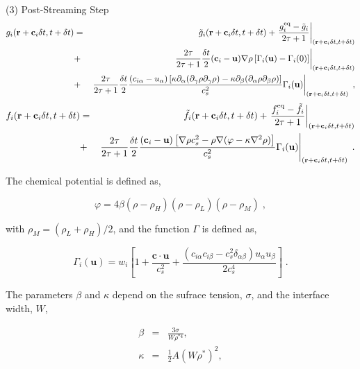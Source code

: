 \documentclass[12pt]{report}
\newcommand{\vect}[1]{\ensuremath{\mathrm{\mathbf{#1}}}}
\begin{document}
{(3) \sc Post-Streaming Step}
\begin{eqnarray}
g_i(\vect{r}+\vect{c}_i\delta t, t + \delta t) & = & \tilde{g}_i(\vect{r}+\vect{c}_i\delta t, t + \delta t) + \left.\frac{g_i^{\rm eq}-\tilde{g}_i}{2\tau + 1}\right|_{(\vect{r}+\vect{c}_i\delta t, t + \delta t)}\nonumber\\
& + & \left.\frac{2\tau}{2\tau+1}\frac{\delta t}{2}(\vect{c}_i - \vect{u})\nabla\rho\left[ \Gamma_i(\vect{u}) - \Gamma_i(0) \right]\right|_{(\vect{r}+\vect{c}_i\delta t, t + \delta t)}\nonumber\\
& + & \left.\frac{2\tau}{2\tau+1}\frac{\delta t}{2}\frac{(c_{i\alpha}-u_\alpha)\left[ \kappa\partial_\alpha(\partial_\gamma\rho\partial_\gamma\rho) -
\kappa\partial_\beta(\partial_\alpha\rho\partial_\beta\rho) \right]}{c_s^2}\Gamma_i(\vect{u})\right|_{(\vect{r}+\vect{c}_i\delta t, t + \delta t)}\;,\label{eq:LeePostStreamG}
\end{eqnarray}
\begin{eqnarray}
f_i(\vect{r}+\vect{c}_i\delta t, t + \delta t) & = & \tilde{f}_i(\vect{r}+\vect{c}_i\delta t, t + \delta t) + \left.\frac{f_i^{\rm eq}-\tilde{f}_i}{2\tau+1}\right|_{(\vect{r}+\vect{c}_i\delta t, t + \delta t)}\nonumber\\
& + & \left.\frac{2\tau}{2\tau+1}\frac{\delta t}{2}\frac{(\vect{c}_i-\vect{u})\left[ \nabla\rho c_s^2-\rho\nabla(\varphi-\kappa\nabla^2\rho) \right]}{c_s^2}\Gamma_i(\vect{u})\right|_{(\vect{r}+\vect{c}_i\delta t, t + \delta t)}\;.\label{eq:LeePostStreamF}
\end{eqnarray}

The chemical potential is defined as,

\begin{equation}
\varphi = 4\beta(\rho - \rho_H)(\rho - \rho_L)(\rho - \rho_M)\;,
\end{equation}

with $\rho_M = (\rho_L + \rho_H)/2$,  and the function $\Gamma$ is defined as,

\begin{equation}
\Gamma_i(\vect{u}) = w_i\left[ 1 + \frac{\vect{c}\cdot \vect{u}}{c_s^2} + \frac{(c_{i\alpha}c_{i\beta}-c_s^2\delta_{\alpha\beta})u_\alpha u_\beta}{2c_s^4} \right]\;.
\end{equation}

The parameters $\beta$ and $\kappa$ depend on the sufrace tension, $\sigma$, and the interface width, $W$,

\begin{eqnarray}
  \beta &=& \frac{3\sigma}{W\rho^{*4}},\\
  \kappa &=& \frac{1}{2}A(W\rho^{*})^2,
\end{eqnarray}
\end{document}
